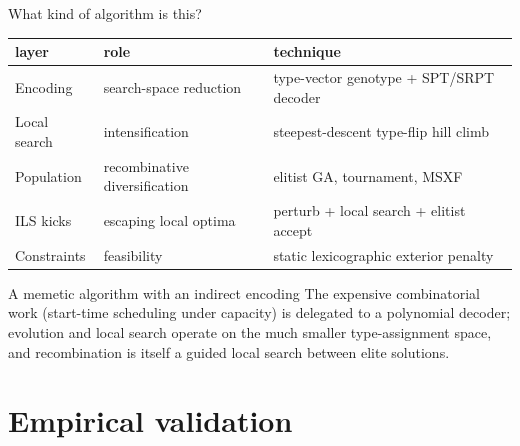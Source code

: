 \documentclass[aspectratio=169,t]{beamer}
\begin{document}
\begin{frame}{What kind of algorithm is this?}
  \begin{center}
  \small
  \begin{tabular}{@{}lll@{}}
    \toprule
    \textbf{layer} & \textbf{role} & \textbf{technique} \\
    \midrule
    Encoding      & search-space reduction         & type-vector genotype + SPT/SRPT decoder \\
    Local search  & intensification                & steepest-descent type-flip hill climb \\
    Population    & recombinative diversification  & elitist GA, tournament, MSXF \\
    ILS kicks     & escaping local optima          & perturb + local search + elitist accept \\
    Constraints   & feasibility                    & static lexicographic exterior penalty \\
    \bottomrule
  \end{tabular}
  \end{center}
  \vspace{2mm}
  \begin{alertblock}{A memetic algorithm with an indirect encoding}
    The expensive combinatorial work (start-time scheduling under capacity)
    is delegated to a polynomial decoder; evolution and local search operate
    on the much smaller type-assignment space, and recombination is itself a
    guided local search between elite solutions.
  \end{alertblock}
\end{frame}

\section{Empirical validation}
\end{document}
